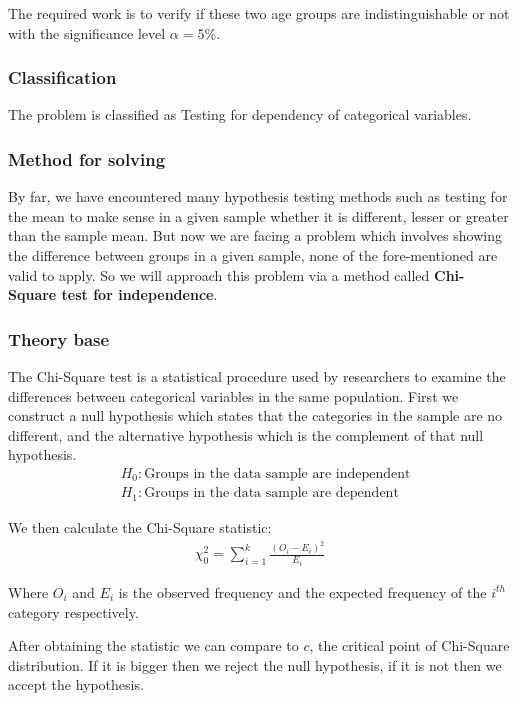 \documentclass[a4paper]{article}
\numberwithin{equation}{section}
\begin{document}
The required work is to verify if these two age groups are indistinguishable or not with the significance level \( \alpha = 5\% \).

\subsubsection{Classification}
The problem is classified as Testing for dependency of categorical variables.

\subsubsection{Method for solving}
By far, we have encountered many hypothesis testing methods such as testing for the mean to make sense in a given sample whether it is different, lesser or greater than the sample mean. But now we are facing a problem which involves showing the difference between groups in a given sample, none of the fore-mentioned are valid to apply. So we will approach this problem via a method called \textbf{Chi-Square test for independence}.

\subsubsection{Theory base}\label{p2:theory}
The Chi-Square test is a statistical procedure used by researchers to examine the differences between categorical variables in the same population. First we construct a null hypothesis which states that the categories in the sample are no different, and the alternative hypothesis which is the complement of that null hypothesis.
\begin{align*}
   & H_0: \text{Groups in the data sample are independent} \\
   & H_1: \text{Groups in the data sample are dependent}
\end{align*}

We then calculate the Chi-Square statistic:
\begin{align*}
  \chi_0^2 = \sum_{i = 1}^{k} \frac{{(O_i - E_i)}^2}{E_i}
\end{align*}\label{chi:stat}

Where \(O_i\) and \(E_i\) is the observed frequency and the expected frequency of the \(i^{th}\) category respectively.

After obtaining the statistic we can compare to \(c\), the critical point of Chi-Square distribution. If it is bigger then we reject the null hypothesis, if it is not then we accept the hypothesis.
\end{document}
